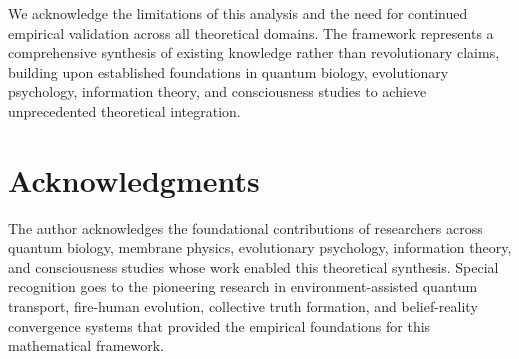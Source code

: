 \documentclass[12pt,a4paper]{article}
\begin{document}
We acknowledge the limitations of this analysis and the need for continued empirical validation across all theoretical domains. The framework represents a comprehensive synthesis of existing knowledge rather than revolutionary claims, building upon established foundations in quantum biology, evolutionary psychology, information theory, and consciousness studies to achieve unprecedented theoretical integration.

\section*{Acknowledgments}

The author acknowledges the foundational contributions of researchers across quantum biology, membrane physics, evolutionary psychology, information theory, and consciousness studies whose work enabled this theoretical synthesis. Special recognition goes to the pioneering research in environment-assisted quantum transport, fire-human evolution, collective truth formation, and belief-reality convergence systems that provided the empirical foundations for this mathematical framework.


\end{document}
